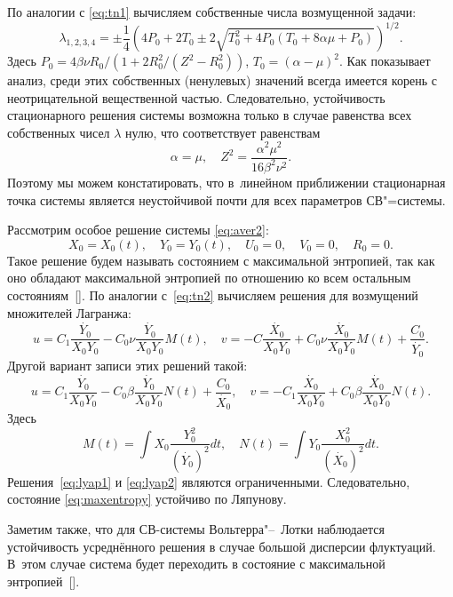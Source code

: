 По аналогии с \eqref{eq:tn1} вычисляем собственные числа возмущенной задачи:
\begin{equation}
\lambda_{1,2,3,4}=\pm\frac{1}{4}\left(4P_0+2T_0 \pm
2\sqrt{T_0^2+4P_0\left(T_0+8\alpha\mu+P_0\right)}\right)^{1/2}.
\end{equation}
Здесь $P_0=4\beta\nu R_0/(1+2R_0^2/(Z^2-R_0^2))$,
$T_0=(\alpha-\mu)^2$. Как показывает анализ, среди этих
собственных (ненулевых) значений всегда имеется корень с
неотрицательной вещественной частью. Следовательно, устойчивость
стационарного решения системы возможна только в случае равенства
всех собственных чисел $\lambda$ нулю, что соответствует
равенствам
\begin{equation}
\alpha=\mu, \quad Z^2=\frac{\alpha^2\mu^2}{16\beta^2\nu^2}.
\end{equation}
Поэтому мы можем констатировать, что в~линейном приближении стационарная точка системы является неустойчивой почти для всех параметров СВ"=системы.

Рассмотрим особое решение системы \eqref{eq:aver2}:
\begin{equation}
X_0=X_0(t), \quad Y_0=Y_0(t), \quad U_0=0, \quad V_0=0, \quad R_0=0. \label{eq:maxentropy}
\end{equation}
Такое решение будем называть состоянием с максимальной энтропией, так как оно обладают максимальной энтропией по отношению ко всем остальным состояниям~[]. По аналогии с~\eqref{eq:tn2} вычисляем решения для возмущений множителей Лагранжа:
\begin{equation}
u = C_1\frac{\dot{Y_0}}{X_0Y_0} -
C_0\nu\frac{\dot{Y_0}}{X_0Y_0}M(t), \quad v=
-C\frac{\dot{X_0}}{X_0Y_0} +
        C_0\nu\frac{\dot{X_0}}{X_0Y_0}M(t)+\frac{C_0}{\dot{Y_0}}.     \label{eq:lyap1}
\end{equation}
Другой вариант записи этих решений такой:
\begin{equation}
u = C_1\frac{\dot{Y_0}}{X_0Y_0}
-C_0\beta\frac{\dot{Y_0}}{X_0Y_0}N(t)+\frac{C_0}{\dot{X_0}}, \quad
        v= -C_1\frac{\dot{X_0}}{X_0Y_0} +
        C_0\beta\frac{\dot{X_0}}{X_0Y_0}N(t).                \label{eq:lyap2}
\end{equation}
Здесь 
$$M(t) = \int X_0\frac{Y^2_0}{(\dot{Y_0})^2}dt,\quad  N(t) = \int Y_0\frac{X^2_0}{(\dot{X_0})^2}dt.$$ Решения~\eqref{eq:lyap1} и \eqref{eq:lyap2} являются ограниченными. Следовательно, состояние \eqref{eq:maxentropy} устойчиво по Ляпунову.

Заметим также, что для СВ-системы Вольтерра"--~Лотки наблюдается устойчивость усреднённого решения в случае большой дисперсии флуктуаций. 
В~этом случае система будет переходить в состояние с максимальной энтропией~[].

